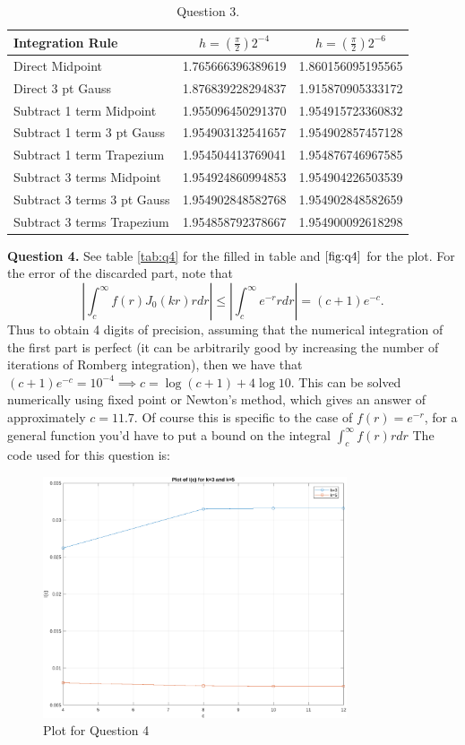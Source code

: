 \documentclass[letterpaper, reqno,11pt]{article}
\begin{document}
\begin{table}
\centering
\begin{tabular}{|l|c|c|}
\hline
Integration Rule & \( h = \left(\frac{\pi}{2}\right)2^{-4} \) & \( h = \left(\frac{\pi}{2}\right)2^{-6} \) \\
\hline
Direct Midpoint & 1.765666396389619 & 1.860156095195565 \\
\hline
Direct 3 pt Gauss & 1.876839228294837 & 1.915870905333172 \\
\hline
Subtract 1 term Midpoint & 1.955096450291370 & 1.954915723360832 \\
\hline
Subtract 1 term 3 pt Gauss & 1.954903132541657 & 1.954902857457128 \\
\hline
Subtract 1 term Trapezium & 1.954504413769041 & 1.954876746967585 \\
\hline
Subtract 3 terms Midpoint & 1.954924860994853 & 1.954904226503539 \\
\hline
Subtract 3 terms 3 pt Gauss & 1.954902848582768 & 1.954902848582659 \\
\hline
Subtract 3 terms Trapezium & 1.954858792378667 & 1.954900092618298 \\
\hline
\end{tabular}
\caption{Question 3.}
\label{tab:q3}
\end{table}

{\medskip\noindent\bf Question 4.} See table \ref{tab:q4} for the filled in table and $\ref{fig:q4}$ for the plot. For the error of the discarded part, note that
\[
\left|\int_{c}^{\infty}f(r)J_0(kr)r dr\right|\leq \left|\int_{c}^{\infty}e^{-r}r dr\right|=(c+1)e^{-c}
.\]
Thus to obtain 4 digits of precision, assuming that the numerical integration of the first part is perfect (it can be arbitrarily good by increasing the number of iterations of Romberg integration), then we have that $(c+1)e^{-c}=10^{-4}\implies c=\log(c+1)+4\log 10$. This can be solved numerically using fixed point or Newton's method, which gives an answer of approximately $c=11.7$. Of course this is specific to the case of $f(r)=e^{-r}$, for a general function you'd have to put a bound on the integral $\int_c^{\infty}f(r)rdr$ The code used for this question is:

\begin{figure}[htpb]
    \centering
    \includegraphics[width=0.8\textwidth]{q4}
    \caption{Plot for Question 4}
    \label{fig:q4}
\end{figure}
\end{document}
